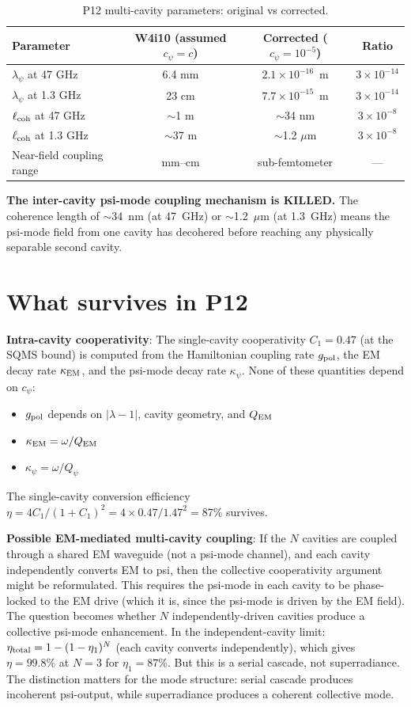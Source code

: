 \documentclass[11pt]{article}
\newcommand{\ee}[1]{\times 10^{#1}}
\newcommand{\lambdaone}{|\lambda{-}1|}
\newcommand{\Qpsi}{Q_\psi}
\newcommand{\QEM}{Q_{\rm EM}}
\begin{document}
\begin{table}[H]
\centering
\caption{P12 multi-cavity parameters: original vs corrected.}
\label{tab:p12-corrected}
\begin{tabular}{@{}lccc@{}}
\toprule
Parameter & W4i10 (assumed $c_\psi = c$) & Corrected ($c_\psi = 10^{-5}$) & Ratio \\
\midrule
$\lambda_\psi$ at 47 GHz & 6.4 mm & $2.1\ee{-16}$~m & $3\ee{-14}$ \\
$\lambda_\psi$ at 1.3 GHz & 23 cm & $7.7\ee{-15}$~m & $3\ee{-14}$ \\
$\ell_{\rm coh}$ at 47 GHz & $\sim$1 m & $\sim$34 nm & $3\ee{-8}$ \\
$\ell_{\rm coh}$ at 1.3 GHz & $\sim$37 m & $\sim$1.2 $\mu$m & $3\ee{-8}$ \\
Near-field coupling range & mm--cm & sub-femtometer & --- \\
\bottomrule
\end{tabular}
\end{table}

\textbf{The inter-cavity psi-mode coupling mechanism is KILLED.} The
coherence length of $\sim$34~nm (at 47~GHz) or $\sim$1.2~$\mu$m
(at 1.3~GHz) means the psi-mode field from one cavity has decohered
before reaching any physically separable second cavity.

\section{What survives in P12}

\textbf{Intra-cavity cooperativity}: The single-cavity cooperativity
$C_1 = 0.47$ (at the SQMS bound) is computed from the Hamiltonian
coupling rate $g_{\rm pol}$, the EM decay rate $\kappa_{\rm EM}$, and
the psi-mode decay rate $\kappa_\psi$. None of these quantities depend
on $c_\psi$:
\begin{itemize}[nosep]
\item $g_{\rm pol}$ depends on $\lambdaone$, cavity geometry, and $\QEM$
\item $\kappa_{\rm EM} = \omega/\QEM$
\item $\kappa_\psi = \omega/\Qpsi$
\end{itemize}

The single-cavity conversion efficiency $\eta = 4C_1/(1+C_1)^2 =
4 \times 0.47/1.47^2 = 87\%$ survives.

\textbf{Possible EM-mediated multi-cavity coupling}: If the $N$ cavities
are coupled through a shared EM waveguide (not a psi-mode channel), and
each cavity independently converts EM to psi, then the collective
cooperativity argument might be reformulated. This requires the psi-mode
in each cavity to be phase-locked to the EM drive (which it is, since
the psi-mode is driven by the EM field). The question becomes whether
$N$ independently-driven cavities produce a collective psi-mode enhancement.
In the independent-cavity limit: $\eta_{\rm total} = 1 - (1-\eta_1)^N$
(each cavity converts independently), which gives $\eta = 99.8\%$ at
$N = 3$ for $\eta_1 = 87\%$. But this is a serial cascade, not
superradiance. The distinction matters for the mode structure: serial
cascade produces incoherent psi-output, while superradiance produces
a coherent collective mode.
\end{document}
